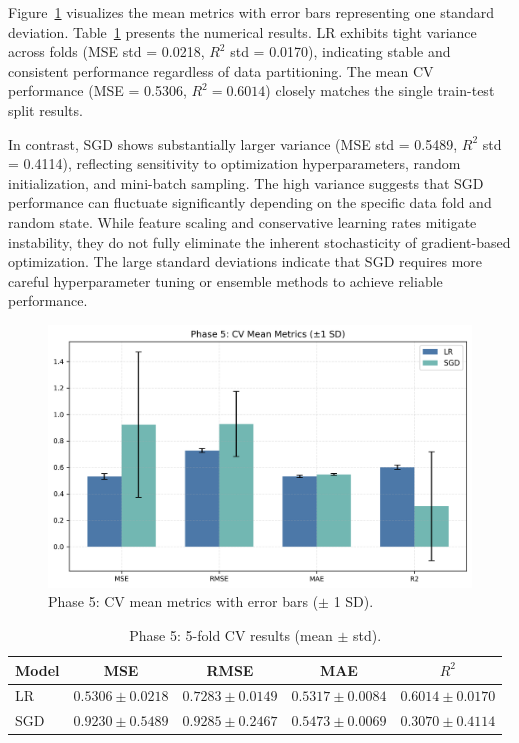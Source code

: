 \documentclass[runningheads]{llncs}
\begin{document}
Figure~\ref{fig:phase5-cv} visualizes the mean metrics with error bars representing one standard deviation. Table~\ref{tab:phase5} presents the numerical results. LR exhibits tight variance across folds (MSE std = 0.0218, $R^2$ std = 0.0170), indicating stable and consistent performance regardless of data partitioning. The mean CV performance (MSE = 0.5306, $R^2 = 0.6014$) closely matches the single train-test split results.

In contrast, SGD shows substantially larger variance (MSE std = 0.5489, $R^2$ std = 0.4114), reflecting sensitivity to optimization hyperparameters, random initialization, and mini-batch sampling. The high variance suggests that SGD performance can fluctuate significantly depending on the specific data fold and random state. While feature scaling and conservative learning rates mitigate instability, they do not fully eliminate the inherent stochasticity of gradient-based optimization. The large standard deviations indicate that SGD requires more careful hyperparameter tuning or ensemble methods to achieve reliable performance.

\begin{figure}[H]
  \centering
  \includegraphics[width=0.95\linewidth]{data/Phase 5 CV Mean Metrics.png}
  \caption{Phase 5: CV mean metrics with error bars ($\pm$ 1 SD).}
  \label{fig:phase5-cv}
\end{figure}

\begin{table}[H]
  \centering
  \caption{Phase 5: 5-fold CV results (mean $\pm$ std).}
  \label{tab:phase5}
  \begin{tabular}{lcccc}
    \toprule
    Model & MSE & RMSE & MAE & $R^2$ \\
    \midrule
    LR  & $0.5306 \pm 0.0218$ & $0.7283 \pm 0.0149$ & $0.5317 \pm 0.0084$ & $0.6014 \pm 0.0170$ \\
    SGD & $0.9230 \pm 0.5489$ & $0.9285 \pm 0.2467$ & $0.5473 \pm 0.0069$ & $0.3070 \pm 0.4114$ \\
    \bottomrule
  \end{tabular}
\end{table}
\end{document}
